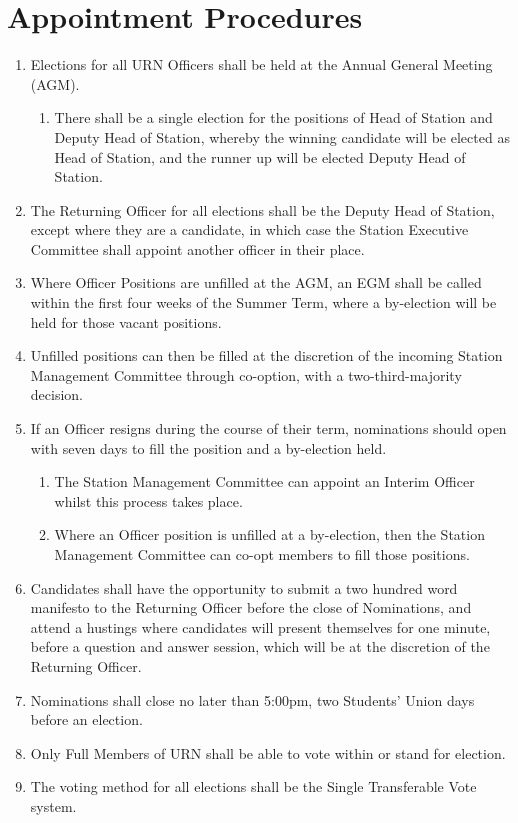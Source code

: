 \section{Appointment Procedures}

\begin{enumerate}[label*=\thesection.\arabic*.]
    \item Elections for all URN Officers shall be held at the Annual General Meeting (AGM).
          \begin{enumerate}[label*=\arabic*.]
              \item There shall be a single election for the positions of Head of Station and Deputy Head of Station, whereby the winning candidate will be elected as Head of Station, and the runner up will be elected Deputy Head of Station.
          \end{enumerate}
    \item The Returning Officer for all elections shall be the Deputy Head of Station, except where they are a candidate, in which case the Station Executive Committee shall appoint another officer in their place.
    \item Where Officer Positions are unfilled at the AGM, an EGM shall be called within the first four weeks of the Summer Term, where a by-election will be held for those vacant positions.
    \item Unfilled positions can then be filled at the discretion of the incoming Station Management Committee through co-option, with a two-third-majority decision.
    \item If an Officer resigns during the course of their term, nominations should open with seven days to fill the position and a by-election held.
          \begin{enumerate}[label*=\arabic*.]
              \item The Station Management Committee can appoint an Interim Officer whilst this process takes place.
              \item Where an Officer position is unfilled at a by-election, then the Station Management Committee can co-opt members to fill those positions.
          \end{enumerate}
    \item Candidates shall have the opportunity to submit a two hundred word manifesto to the Returning Officer before the close of Nominations, and attend a hustings where candidates will present themselves for one minute, before a question and answer session, which will be at the discretion of the Returning Officer.
    \item Nominations shall close no later than 5:00pm, two Students' Union days before an election.
    \item Only Full Members of URN shall be able to vote within or stand for election.
    \item The voting method for all elections shall be the Single Transferable Vote system.
\end{enumerate}

